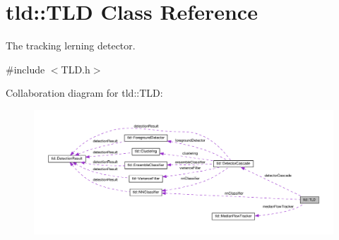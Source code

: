 \hypertarget{classtld_1_1TLD}{\section{tld\-:\-:T\-L\-D Class Reference}
\label{classtld_1_1TLD}
}


The tracking lerning detector.  




{\ttfamily \#include $<$T\-L\-D.\-h$>$}



Collaboration diagram for tld\-:\-:T\-L\-D\-:\nopagebreak
\begin{figure}[H]
\begin{center}
\leavevmode
\includegraphics[width=350pt]{classtld_1_1TLD__coll__graph}
\end{center}
\end{figure}
